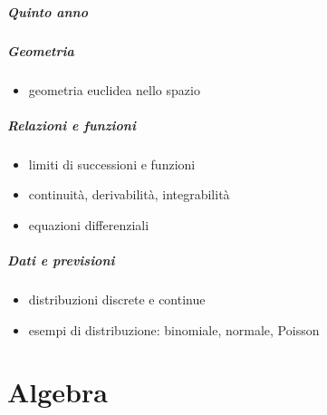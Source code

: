 \documentclass[letterpaper,10pt,english]{jupyterBook}
\begin{document}
\subsubsection*{Quinto anno}
\subsubsection*{Geometria}
\begin{itemize}
\item {} 
\sphinxAtStartPar
geometria euclidea nello spazio

\end{itemize}
\subsubsection*{Relazioni e funzioni}
\begin{itemize}
\item {} 
\sphinxAtStartPar
limiti di successioni e funzioni

\item {} 
\sphinxAtStartPar
continuità, derivabilità, integrabilità

\item {} 
\sphinxAtStartPar
equazioni differenziali

\end{itemize}
\subsubsection*{Dati e previsioni}
\begin{itemize}
\item {} 
\sphinxAtStartPar
distribuzioni discrete e continue

\item {} 
\sphinxAtStartPar
esempi di distribuzione: binomiale, normale, Poisson

\end{itemize}

\sphinxstepscope


\part{Algebra}

\sphinxstepscope
\end{document}

